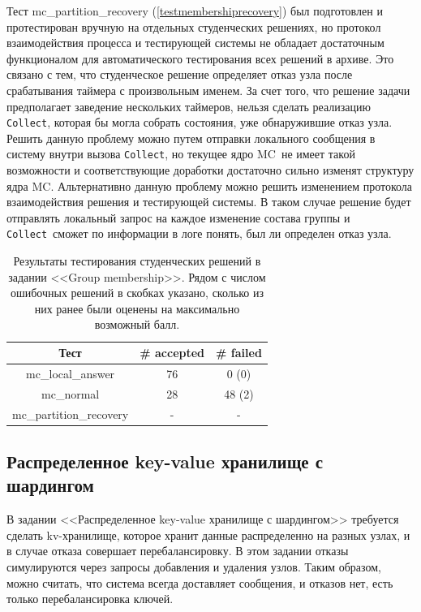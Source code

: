 \documentclass[a4paper,12pt]{extarticle}
\newcommand{\collect}[0]{\texttt{Collect}}
\newcommand{\mc}[0]{MC}
\begin{document}
Тест mc\_partition\_recovery (\cref{testmembershiprecovery}) был подготовлен и протестирован вручную на отдельных студенческих решениях, но протокол взаимодействия процесса и тестирующей системы не обладает достаточным функционалом для автоматического тестирования всех решений в архиве.
Это связано с тем, что студенческое решение определяет отказ узла после срабатывания таймера с произвольным именем.
За счет того, что решение задачи предполагает заведение нескольких таймеров, нельзя сделать реализацию \collect, которая бы могла собрать состояния, уже обнаружившие отказ узла.
Решить данную проблему можно путем отправки локального сообщения в систему внутри вызова \collect, но текущее ядро \mc\ не имеет такой возможности и соответствующие доработки достаточно сильно изменят структуру ядра \mc.
Альтернативно данную проблему можно решить изменением протокола взаимодействия решения и тестирующей системы.
В таком случае решение будет отправлять локальный запрос на каждое изменение состава группы и \collect\ сможет по информации в логе понять, был ли определен отказ узла.

\begin{table}[htbp]
    \caption{Результаты тестирования студенческих решений в задании <<Group membership>>. Рядом с числом ошибочных решений в скобках указано, сколько из них ранее были оценены на максимально возможный балл. }
    \begin{center}
    \begin{tabular}{|c|c|c|}
    \hline
    \textbf{Тест} & \textbf{\# accepted} & \textbf{\# failed}  \\
    \hline
    mc\_local\_answer  & 76 & 0 (0) \\
    \hline
    mc\_normal  & 28 & 48 (2) \\
    \hline
    mc\_partition\_recovery & - & -  \\
    \hline

    \end{tabular}
    \label{tab7}
    \end{center}
\end{table}


\subsection{Распределенное key-value хранилище с шардингом}
\label{KVSHARDING}


В задании <<Распределенное key-value хранилище с шардингом>> \cite{b16} требуется сделать kv-хранилище, которое хранит данные распределенно на разных узлах, и в случае отказа совершает перебалансировку.
В этом задании отказы симулируются через запросы добавления и удаления узлов.
Таким образом, можно считать, что система всегда доставляет сообщения, и отказов нет, есть только перебалансировка ключей.
\end{document}
